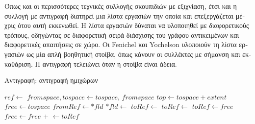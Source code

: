 \begin{greek}
Όπως και οι περισσότερες τεχνικές συλλογής σκουπιδιών με εξιχνίαση, 
έτσι και η συλλογή με αντιγραφή διατηρεί μια λίστα εργασιών την 
οποία και επεξεργάζεται μέχρις ότου αυτή εκκενωθεί. Η λίστα εργασιών 
δύναται να υλοποιηθεί με διαφορετικούς τρόπους, οδηγώντας σε 
διαφορετική σειρά διάσχισης του γράφου αντικειμένων και διαφορετικές 
απαιτήσεις σε χώρο. Οι Fenichel και Yochelson \cite{DBLP:journals/cacm/FenichelY69}
υλοποιούν τη λίστα εργασιών ως μία απλή βοηθητική στοίβα, όπως 
κάνουν οι συλλέκτες με σήμανση και εκκαθάριση. Η αντιγραφή τελειώνει 
όταν η στοίβα είναι άδεια.

\begin{algorithm}[H]
  \caption{Αντιγραφή: αντιγραφή ημιχώρων}
  \label{alg:cop_2}
  \begin{algorithmic}[1]
      \State {}
      \State {} 
       
        \State {}
      \EndFor
       
        \State $ref \gets$ 
        \State {}
      \EndWhile    
    \EndProcedure
    \Statex
      \State $fromspace, tospace \gets tospace, \, fromspace$
       \State $top \gets tospace + extent$
      \State $free \gets tospace$
    \EndProcedure  
    \Statex
        \State {}      
      \EndFor
    \EndProcedure
    \Statex
     
      \State $fromRef \gets *fld$
        \State $*fld \gets$  
      \EndIf
    \EndProcedure
    \Statex
      \State $toRef \gets$ 
       
        \State $toRef \gets$ 
      \EndIf
      \State {}
    \EndFunction
    \Statex                                                  
     
      \State $toRef \gets free$
      \State $free \gets free$ $+$ 
      \State {}
      \State {} $\gets toRef$ 
      \State {}
      \State {}
    \EndFunction
  \end{algorithmic}
\end{algorithm}


\end{greek}
